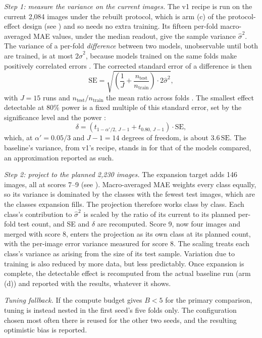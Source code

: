 \documentclass{icsthesis}
\newcommand{\secref}[1]{\textit{\nameref{#1}}}
\begin{document}
\begin{mainmatter}
				\textit{Step 1: measure the variance on the current images.} The v1 recipe is
				run on the current 2,084 images under the rebuilt protocol, which is arm (c) of
				the protocol-effect design (see \secref{sec:armdesign}) and so needs no extra
				training. Its fifteen per-fold macro-averaged MAE values, under the median
				readout, give the sample variance $\hat{\sigma}^2$. The variance of a per-fold
				\textit{difference} between two models, unobservable until both are trained, is
				at most $2\hat{\sigma}^2$, because models trained on the same folds make
				positively correlated errors \citep[Theorem~4.5.6]{casella2002}. The corrected
				standard error of a difference is then
				\[
					\mathrm{SE} = \sqrt{\left(\frac{1}{J} +
					\frac{n_{\text{test}}}{n_{\text{train}}}\right) \cdot 2\hat{\sigma}^2},
				\]
				with $J = 15$ runs and $n_{\text{test}}/n_{\text{train}}$ the mean ratio across
				folds \citep{nadeau2003,bouckaert2004}. The smallest effect detectable at 80\%
				power is a fixed multiple of this standard error, set by the significance level
				and the power \citep{bloom1995}:
				\[
					\delta = \left(t_{1-\alpha'/2,\,J-1} + t_{0.80,\,J-1}\right) \cdot
					\mathrm{SE},
				\]
				which, at $\alpha' = 0.05/3$ and $J - 1 = 14$ degrees of freedom, is about
				$3.6\,\mathrm{SE}$.
				The baseline's variance, from v1's recipe, stands in for that of the models
				compared, an approximation reported as such.

				\textit{Step 2: project to the planned 2,230 images.} The expansion target adds
				146 images, all at scores 7--9 (see \secref{sec:expansion}). Macro-averaged MAE
				weights every class equally, so its variance is dominated by the classes with
				the fewest test images, which are the classes expansion fills. The projection
				therefore works class by class. Each class's contribution to $\hat{\sigma}^2$ is
				scaled by the ratio of its current to its planned per-fold test count, and SE
				and $\delta$ are recomputed. Score 9, now four images and merged with score 8,
				enters the projection as its own class at its planned count, with the per-image
				error variance measured for score 8. The scaling treats each class's variance as
				arising from the size of its test sample. Variation due to training is also
				reduced by more data, but less predictably. Once
				expansion is complete, the detectable effect is recomputed from the actual
				baseline run (arm (d)) and reported with the results, whatever it shows.

				\textit{Tuning fallback.} If the compute budget gives $B < 5$ for the primary comparison, tuning is instead
					nested in the first seed's five folds only. The configuration chosen
					most often there is reused for the other two seeds, and the resulting
					optimistic bias is reported.


\end{mainmatter}
\end{document}
